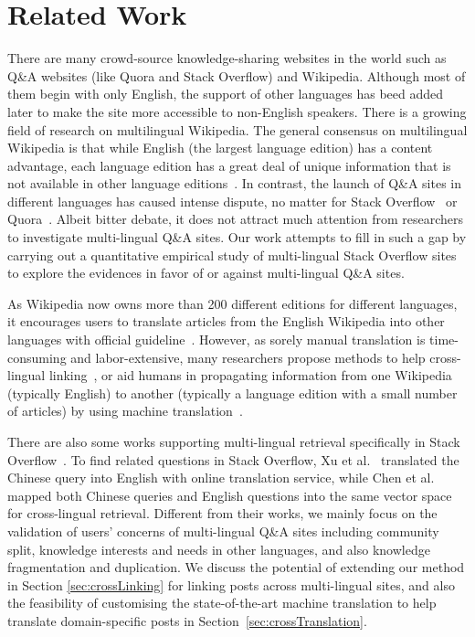 
\section{Related Work}
There are many crowd-source knowledge-sharing websites in the world such as Q\&A websites (like Quora and Stack Overflow) and Wikipedia.
Although most of them begin with only English, the support of other languages has beed added later to make the site more accessible to non-English speakers.
There is a growing field of research on multilingual Wikipedia.
The general consensus on multilingual Wikipedia is that while English (the largest language edition) has a content advantage, each language edition has a great deal of unique information that is not available in other language editions~\cite{filatova2009multilingual, hecht2010tower}.
In contrast, the launch of Q\&A sites in different languages has caused intense dispute, no matter for Stack Overflow~\cite{web:SOdiscussion1, web:SOdiscussion2} or Quora~\cite{web:QuoraDiscussion}. 
Albeit bitter debate, it does not attract much attention from researchers to investigate multi-lingual Q\&A sites.
Our work attempts to fill in such a gap by carrying out a quantitative empirical study of multi-lingual Stack Overflow sites to explore the evidences in favor of or against multi-lingual Q\&A sites.

As Wikipedia now owns more than 200 different editions for different languages, it encourages users to translate articles from the English Wikipedia into other languages with official guideline~\cite{web:WikipediaMultiLingual}.
However, as sorely manual translation is time-consuming and labor-extensive, many researchers propose methods to help cross-lingual linking~\cite{wang2012cross, wang2014cross, wulczyn2016growing}, or aid humans in propagating information from one Wikipedia (typically English) to another (typically a language edition with a small number of articles) by using machine translation~\cite{adar2009information, kumaran2010wikibabel, bao2012omnipedia}.

There are also some works supporting multi-lingual retrieval specifically in Stack Overflow~\cite{xu2016domain, chen2016learning}.
To find related questions in Stack Overflow, Xu et al.~\cite{xu2016domain} translated the Chinese query into English with online translation service, while Chen et al.~\cite{chen2016learning} mapped both Chinese queries and English questions into the same vector space for cross-lingual retrieval.
Different from their works, we mainly focus on the validation of users' concerns of multi-lingual Q\&A sites including community split, knowledge interests and needs in other languages, and also knowledge fragmentation and duplication.
We discuss the potential of extending our method in Section \ref{sec:crossLinking} for linking posts across multi-lingual sites, and also the feasibility of customising the state-of-the-art machine translation to help translate domain-specific posts in Section~\ref{sec:crossTranslation}. 

